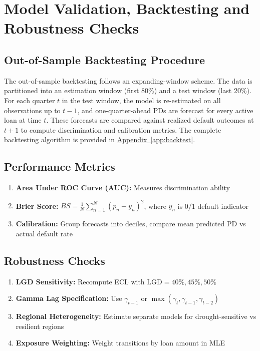 \documentclass[12pt,a4paper]{article}
\newcommand{\LGD}{\text{LGD}}
\begin{document}
\section{Model Validation, Backtesting and Robustness Checks}

\subsection{Out-of-Sample Backtesting Procedure}

The out-of-sample backtesting follows an expanding-window scheme. The data is partitioned into an estimation window (first 80\%) and a test window (last 20\%). For each quarter $t$ in the test window, the model is re-estimated on all observations up to $t-1$, and one-quarter-ahead PDs are forecast for every active loan at time $t$. These forecasts are compared against realized default outcomes at $t+1$ to compute discrimination and calibration metrics. The complete backtesting algorithm is provided in \hyperref[app:backtest]{Appendix~\ref*{app:backtest}}.

\subsection{Performance Metrics}

\begin{enumerate}[noitemsep]
    \item \textbf{Area Under ROC Curve (AUC):} Measures discrimination ability
    \item \textbf{Brier Score:} $BS = \frac{1}{N} \sum_{n=1}^N (p_n - y_n)^2$, where $y_n$ is 0/1 default indicator
    \item \textbf{Calibration:} Group forecasts into deciles, compare mean predicted PD vs actual default rate
\end{enumerate}

\subsection{Robustness Checks}

\begin{enumerate}[noitemsep]
    \item \textbf{LGD Sensitivity:} Recompute ECL with $\LGD = 40\%, 45\%, 50\%$
    \item \textbf{Gamma Lag Specification:} Use $\gamma_{t-1}$ or $\max(\gamma_t, \gamma_{t-1}, \gamma_{t-2})$
    \item \textbf{Regional Heterogeneity:} Estimate separate models for drought-sensitive vs resilient regions
    \item \textbf{Exposure Weighting:} Weight transitions by loan amount in MLE
\end{enumerate}
\end{document}

